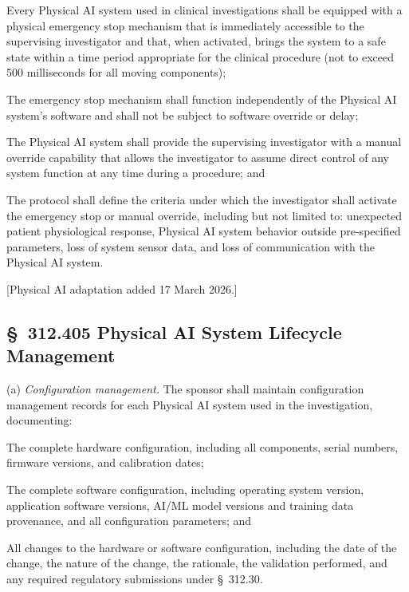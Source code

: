 \documentclass[11pt]{article}
\begin{document}
\begin{description}[leftmargin=0.8cm,style=sameline]
\item[(1)] Every Physical AI system used in clinical investigations shall be equipped with a physical emergency stop mechanism that is immediately accessible to the supervising investigator and that, when activated, brings the system to a safe state within a time period appropriate for the clinical procedure (not to exceed 500 milliseconds for all moving components);
\item[(2)] The emergency stop mechanism shall function independently of the Physical AI system's software and shall not be subject to software override or delay;
\item[(3)] The Physical AI system shall provide the supervising investigator with a manual override capability that allows the investigator to assume direct control of any system function at any time during a procedure; and
\item[(4)] The protocol shall define the criteria under which the investigator shall activate the emergency stop or manual override, including but not limited to: unexpected patient physiological response, Physical AI system behavior outside pre-specified parameters, loss of system sensor data, and loss of communication with the Physical AI system.
\end{description}

[Physical AI adaptation added 17 March 2026.]

\subsection{\S~312.405 Physical AI System Lifecycle Management}

(a) \textit{Configuration management.} The sponsor shall maintain configuration management records for each Physical AI system used in the investigation, documenting:

\begin{description}[leftmargin=0.8cm,style=sameline]
\item[(1)] The complete hardware configuration, including all components, serial numbers, firmware versions, and calibration dates;
\item[(2)] The complete software configuration, including operating system version, application software versions, AI/ML model versions and training data provenance, and all configuration parameters; and
\item[(3)] All changes to the hardware or software configuration, including the date of the change, the nature of the change, the rationale, the validation performed, and any required regulatory submissions under \S~312.30.
\end{description}
\end{document}
